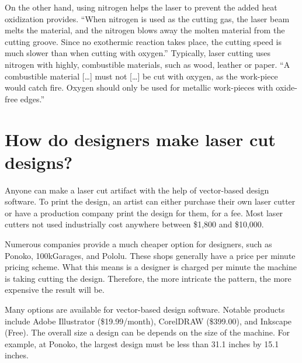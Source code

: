\documentclass[12pt singlecol]{article}
\begin{document}
\begin{flushleft}
On the other hand, using nitrogen helps the laser to prevent the added heat oxidization provides. ``When nitrogen is used as the cutting gas, the laser beam melts the material, and the nitrogen blows away the molten material from the cutting groove. Since no exothermic reaction takes place, the cutting speed is much slower than when cutting with oxygen.'' \cite{agan12} Typically, laser cutting uses nitrogen with highly, combustible materials, such as wood, leather or paper. ``A combustible material [\ldots] must not [\ldots] be cut with oxygen, as the work-piece would catch fire. Oxygen should only be used for metallic work-pieces with oxide-free edges.'' \cite{esab13}

\section{How do designers make laser cut designs?}

Anyone can make a laser cut artifact with the help of vector-based design software. To print the design, an artist can either purchase their own laser cutter or have a production company print the design for them, for a fee. Most laser cutters not used industrially cost anywhere between \$1,800 and \$10,000. \cite{fsl11} 

Numerous companies provide a much cheaper option for designers, such as Ponoko, 100kGarages, and Pololu. These shops generally have a price per minute pricing scheme. What this means is a designer is charged per minute the machine is taking cutting the design. Therefore, the more intricate the pattern, the more expensive the result will be. \cite{PonokoPrice13,garages12,pololu12}

Many options are available for vector-based design software. Notable products include Adobe Illustrator (\$19.99/month), CorelDRAW (\$399.00), and Inkscape (Free). \cite{adobe13,corel13,inkscape13} The overall size a design can be depends on the size of the machine. For example, at Ponoko, the largest design must be less than 31.1 inches by 15.1 inches. \cite{PonokoStarter13} 


\end{flushleft}
\end{document}
